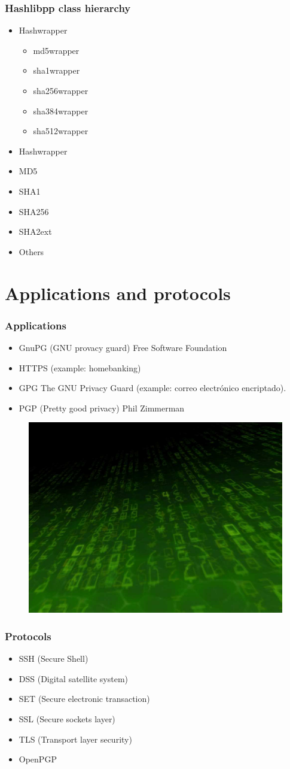 \documentclass{beamer}
\begin{document}
\begin{frame}
\frametitle{Hashlibpp class hierarchy}
\begin{itemize}
\item Hashwrapper
\begin{itemize}
\item md5wrapper
\item sha1wrapper
\item sha256wrapper
\item sha384wrapper
\item sha512wrapper
\end{itemize}
\item Hashwrapper
\item MD5
\item SHA1
\item SHA256
\item SHA2ext
\item Others
\end{itemize}
\end{frame}

\section{Applications and protocols}

\begin{frame}
\frametitle{Applications}
\begin{itemize}
\item GnuPG (GNU provacy guard) Free Software Foundation
\item HTTPS (example: homebanking)
\item GPG The GNU Privacy Guard (example: correo electrónico encriptado).
\item PGP (Pretty good privacy) Phil Zimmerman
\end{itemize}
\begin{figure}
\includegraphics[width=0.2\linewidth]{pgp.png}
\end{figure}
\end{frame}

\begin{frame}
\frametitle{Protocols}
\begin{itemize}
\item SSH (Secure Shell)
\item DSS (Digital satellite system)
\item SET (Secure electronic transaction)
\item SSL (Secure sockets layer) 
\item TLS (Transport layer security)
\item OpenPGP
\end{itemize}
\end{frame}
\end{document}
